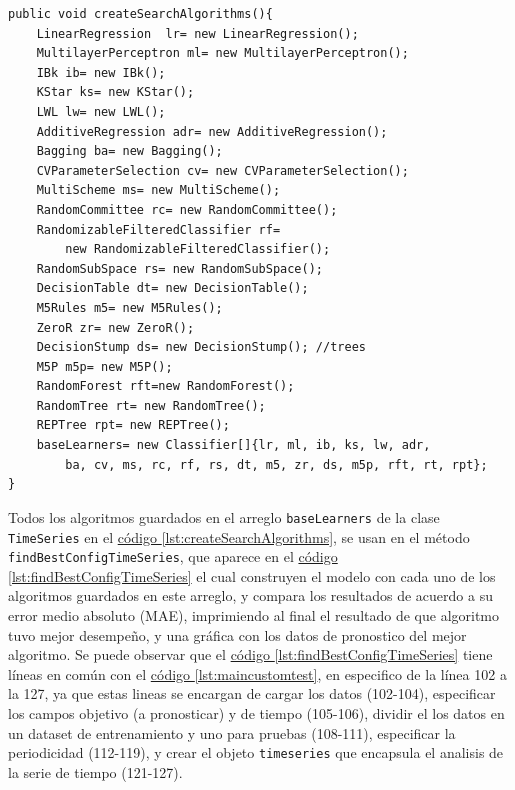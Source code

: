 \begin{lstlisting}[frame=single]  
public void createSearchAlgorithms(){
	LinearRegression  lr= new LinearRegression();
	MultilayerPerceptron ml= new MultilayerPerceptron();
	IBk ib= new IBk();
	KStar ks= new KStar();
	LWL lw= new LWL();
	AdditiveRegression adr= new AdditiveRegression();
	Bagging ba= new Bagging();
	CVParameterSelection cv= new CVParameterSelection();
	MultiScheme ms= new MultiScheme();
	RandomCommittee rc= new RandomCommittee();
	RandomizableFilteredClassifier rf= 
		new RandomizableFilteredClassifier();
	RandomSubSpace rs= new RandomSubSpace();
	DecisionTable dt= new DecisionTable();
	M5Rules m5= new M5Rules();
	ZeroR zr= new ZeroR();
	DecisionStump ds= new DecisionStump(); //trees
	M5P m5p= new M5P();
	RandomForest rft=new RandomForest();
	RandomTree rt= new RandomTree();
	REPTree rpt= new REPTree();
	baseLearners= new Classifier[]{lr, ml, ib, ks, lw, adr,
		ba, cv, ms, rc, rf, rs, dt, m5, zr, ds, m5p, rft, rt, rpt};
}
\end{lstlisting}

Todos los algoritmos guardados en el arreglo \texttt{baseLearners} de la clase \texttt{TimeSeries} en el \hyperref[lst:createSearchAlgorithms]{ código \ref{lst:createSearchAlgorithms}}, se usan en el método \texttt{findBestConfigTimeSeries}, que aparece en el 
\hyperref[lst:findBestConfigTimeSeries]{ código \ref{lst:findBestConfigTimeSeries}} el cual construyen el modelo con cada uno de los algoritmos guardados en este arreglo, y compara los resultados de acuerdo a su error medio absoluto (MAE), imprimiendo al final el resultado de que algoritmo tuvo mejor desempeño, y una gráfica con los datos de pronostico del mejor algoritmo.
Se puede observar que el 
\hyperref[lst:findBestConfigTimeSeries]{ código \ref{lst:findBestConfigTimeSeries}} tiene líneas en común con 
el \hyperref[lst:maincustomtest]{ código \ref{lst:maincustomtest}}, en especifico de la línea 102 a la 127, ya que estas lineas se encargan de cargar los datos (102-104), especificar los campos objetivo (a pronosticar) y de tiempo (105-106), dividir el los datos en un dataset de entrenamiento y uno para pruebas (108-111), especificar la periodicidad (112-119), y crear el objeto \texttt{timeseries} que encapsula el analisis de la serie de tiempo (121-127).


